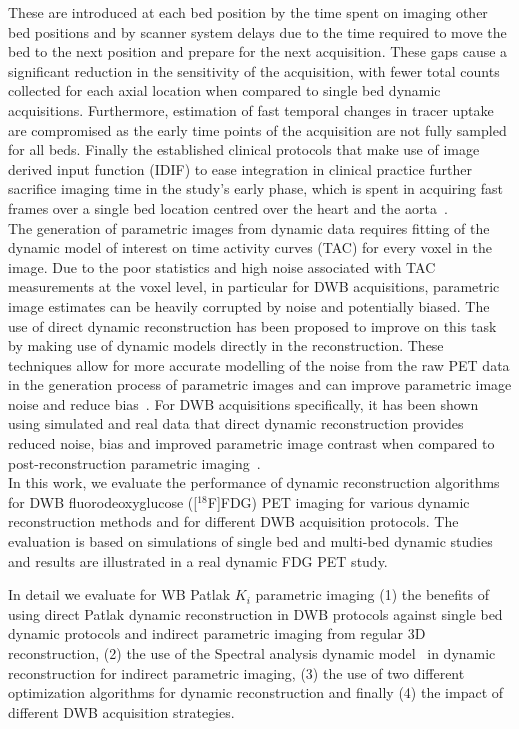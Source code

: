 These are introduced at each bed position by the time spent on imaging other bed positions and by scanner system delays due to the time required to move the bed to the next position and prepare for the next acquisition.
These gaps cause a significant reduction in the sensitivity of the acquisition, with fewer total counts collected for each axial location when compared to single bed dynamic acquisitions. Furthermore, estimation of fast temporal changes in tracer uptake are compromised as the early time points of the acquisition are not fully sampled for all beds. Finally the established clinical protocols that make use of image derived input function (IDIF) to ease integration in clinical practice further sacrifice imaging time in the study’s early phase, which is spent in acquiring fast frames over a single bed location centred over the heart and the aorta~\cite{Hu2020}. \\
The generation of parametric images from dynamic data requires fitting of the dynamic model of interest on time activity curves (TAC) for every voxel in the image. 
Due to the poor statistics and high noise associated with TAC measurements at the voxel level, in particular for DWB acquisitions, parametric image estimates can be heavily corrupted by noise and potentially biased. 
The use of direct dynamic reconstruction has been proposed to improve on this task by making use of dynamic models directly in the reconstruction. These techniques allow for more accurate modelling of the noise from the raw PET data in the generation process of parametric images and can improve parametric image noise and reduce bias~\cite{Reader2014}. For DWB acquisitions specifically, it has been shown using simulated and real data that direct dynamic reconstruction provides reduced noise, bias and improved parametric image contrast when compared to post-reconstruction parametric imaging~\cite{Karakatsanis2016a}.\\
In this work, we evaluate the performance of dynamic reconstruction algorithms for DWB fluorodeoxyglucose ([$^{18}$F]FDG) PET imaging for various dynamic reconstruction methods and for different DWB acquisition protocols. The evaluation is based on simulations of single bed and multi-bed dynamic studies and results are illustrated in a real dynamic FDG PET study.


In detail we evaluate for WB Patlak $K_i$ parametric imaging 
(1) the benefits of using direct Patlak dynamic reconstruction in DWB protocols against single bed dynamic protocols and indirect parametric imaging from regular 3D reconstruction, 
(2) the use of the Spectral analysis dynamic model~\cite{Cunningham1993} in dynamic reconstruction for indirect parametric imaging,
(3) the use of two different optimization algorithms for dynamic reconstruction
and finally (4) the impact of different DWB acquisition strategies.

